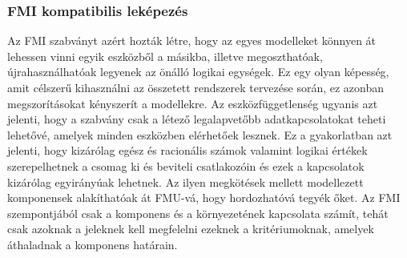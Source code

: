         \subsubsection{FMI kompatibilis leképezés} \label{sec:fmiKompat}
        Az FMI szabványt azért hozták létre, hogy az egyes modelleket könnyen át lehessen vinni egyik eszközből a másikba, illetve megoszthatóak, újrahasználhatóak legyenek az önálló logikai egységek.
        Ez egy olyan képesség, amit célszerű kihasználni az összetett rendszerek tervezése során, ez azonban megszorításokat kényszerít a modellekre.
        Az eszközfüggetlenség ugyanis azt jelenti, hogy a szabvány csak a létező legalapvetőbb adatkapcsolatokat teheti lehetővé, amelyek minden eszközben elérhetőek lesznek.
        Ez a gyakorlatban azt jelenti, hogy kizárólag egész és racionális számok valamint logikai értékek szerepelhetnek a csomag ki és beviteli csatlakozóin és ezek a kapcsolatok kizárólag egyirányúak lehetnek.
        Az ilyen megkötések mellett modellezett komponensek alakíthatóak át FMU-vá, hogy hordozhatóvá tegyék őket.
        Az FMI szempontjából csak a komponens és a környezetének kapcsolata számít, tehát csak azoknak a jeleknek kell megfelelni ezeknek a kritériumoknak, amelyek áthaladnak a komponens határain.

